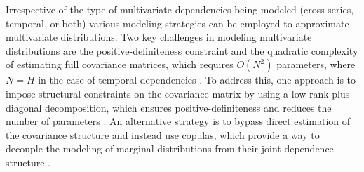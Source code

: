 \documentclass[a4paper,oneside,bibliography=totoc]{scrbook}
\begin{document}
Irrespective of the type of multivariate dependencies being modeled (cross-series, temporal, or both) various modeling strategies can be employed to approximate multivariate distributions. 
Two key challenges in modeling multivariate distributions are the positive-definiteness constraint and the quadratic complexity of estimating full covariance matrices, which requires $O(N^2)$ parameters, where $N=H$ in the case of temporal dependencies \cite{pourahmadi_covariance_2011}. 
To address this, one approach is to impose structural constraints on the covariance matrix by using a low-rank plus diagonal decomposition, which ensures positive-definiteness and reduces the number of parameters \cite{wu_high-dimensional_2020, horn_chapter_2012}. 
An alternative strategy is to bypass direct estimation of the covariance structure and instead use copulas, which provide a way to decouple the modeling of marginal distributions from their joint dependence structure \cite{wilson_copula_2010, groser_copulae_2022}. 
\end{document}

